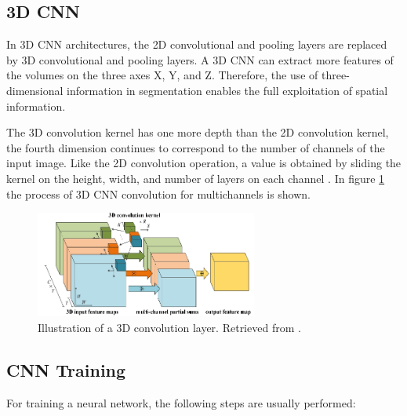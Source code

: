 \subsection*{\ac{3D} \ac{CNN}}
\label{subsection:3dcnn}
In \ac{3D} \ac{CNN} architectures, the \ac{2D} convolutional and pooling layers are replaced by \ac{3D} convolutional and pooling layers. A \ac{3D} \ac{CNN} can extract more features of the volumes on the three axes X, Y, and Z. Therefore, the use of three-dimensional information in segmentation enables the full exploitation of spatial information.

The \ac{3D} convolution kernel has one more depth than the \ac{2D} convolution kernel, the fourth dimension continues to correspond to the number of channels of the input image. Like the \ac{2D} convolution operation, a value is obtained by sliding the kernel on the height, width, and number of layers on each channel \cite{2018guide}. In figure \ref{fig:cnn_3D} the process of \ac{3D} \ac{CNN} convolution for multichannels is shown.

\begin{figure}[!htb]
  \centering
  \includegraphics[width=0.65\textwidth]{Images/3dconv.jpg}
  \caption[Illustration of a \ac{3D} convolution layer]{Illustration of a \ac{3D} convolution layer. Retrieved from \cite{CNN:3D}.}
  \label{fig:cnn_3D}
\end{figure}


\subsection{\ac{CNN} Training}

For training a neural network, the following steps are usually performed:

